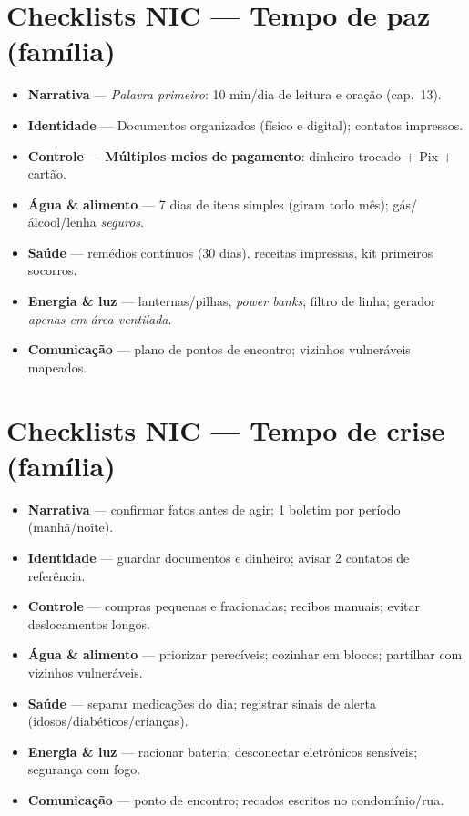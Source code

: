 \section{Checklists NIC --- Tempo de paz (família)}
\begin{checklist}[title={Paz: 7 hábitos básicos},breakable]
\begin{itemize}[leftmargin=*,noitemsep]
  \item \textbf{Narrativa} — \emph{Palavra primeiro}: 10 min/dia de leitura e oração (cap.~13).
  \item \textbf{Identidade} — Documentos organizados (físico e digital); contatos impressos.
  \item \textbf{Controle} — \textbf{Múltiplos meios de pagamento}: dinheiro trocado + Pix + cartão.
  \item \textbf{Água \& alimento} — 7 dias de itens simples (giram todo mês); gás/álcool/lenha \emph{seguros}.
  \item \textbf{Saúde} — remédios contínuos (30 dias), receitas impressas, kit primeiros socorros.
  \item \textbf{Energia \& luz} — lanternas/pilhas, \emph{power banks}, filtro de linha; gerador \emph{apenas em área ventilada}.
  \item \textbf{Comunicação} — plano de pontos de encontro; vizinhos vulneráveis mapeados.
\end{itemize}
\end{checklist}

\section{Checklists NIC --- Tempo de crise (família)}
\begin{checklist}[title={Crise: 48--72h},breakable]
\begin{itemize}[leftmargin=*,noitemsep]
  \item \textbf{Narrativa} — confirmar fatos antes de agir; 1 boletim por período (manhã/noite).
  \item \textbf{Identidade} — guardar documentos e dinheiro; avisar 2 contatos de referência.
  \item \textbf{Controle} — compras pequenas e fracionadas; recibos manuais; evitar deslocamentos longos.
  \item \textbf{Água \& alimento} — priorizar perecíveis; cozinhar em blocos; partilhar com vizinhos vulneráveis.
  \item \textbf{Saúde} — separar medicações do dia; registrar sinais de alerta (idosos/diabéticos/crianças).
  \item \textbf{Energia \& luz} — racionar bateria; desconectar eletrônicos sensíveis; segurança com fogo.
  \item \textbf{Comunicação} — ponto de encontro; recados escritos no condomínio/rua.
\end{itemize}
\end{checklist}

